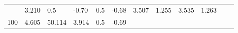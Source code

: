 \documentclass{article}
\begin{document}
\begin{longtable}[]{@{}llllllllllll@{}}
\begin{minipage}[t]{0.06\columnwidth}
\end{minipage} & \begin{minipage}[t]{0.08\columnwidth}\raggedright\strut
3.210\strut
\end{minipage} & \begin{minipage}[t]{0.03\columnwidth}\raggedright\strut
0.5\strut
\end{minipage} & \begin{minipage}[t]{0.06\columnwidth}\raggedright\strut
-0.70\strut
\end{minipage} & \begin{minipage}[t]{0.03\columnwidth}\raggedright\strut
0.5\strut
\end{minipage} & \begin{minipage}[t]{0.06\columnwidth}\raggedright\strut
-0.68\strut
\end{minipage} & \begin{minipage}[t]{0.06\columnwidth}\raggedright\strut
3.507\strut
\end{minipage} & \begin{minipage}[t]{0.08\columnwidth}\raggedright\strut
1.255\strut
\end{minipage} & \begin{minipage}[t]{0.06\columnwidth}\raggedright\strut
3.535\strut
\end{minipage} & \begin{minipage}[t]{0.09\columnwidth}\raggedright\strut
1.263\strut
\end{minipage}\tabularnewline
\begin{minipage}[t]{0.03\columnwidth}\raggedright\strut
100\strut
\end{minipage} & \begin{minipage}[t]{0.06\columnwidth}\raggedright\strut
4.605\strut
\end{minipage} & \begin{minipage}[t]{0.06\columnwidth}\raggedright\strut
50.114\strut
\end{minipage} & \begin{minipage}[t]{0.08\columnwidth}\raggedright\strut
3.914\strut
\end{minipage} & \begin{minipage}[t]{0.03\columnwidth}\raggedright\strut
0.5\strut
\end{minipage} & \begin{minipage}[t]{0.06\columnwidth}\raggedright\strut
-0.69\strut
\end{minipage} & \begin{minipage}[t]{0.03\columnwidth}\raggedright\strut

\end{minipage}
\end{longtable}
\end{document}
